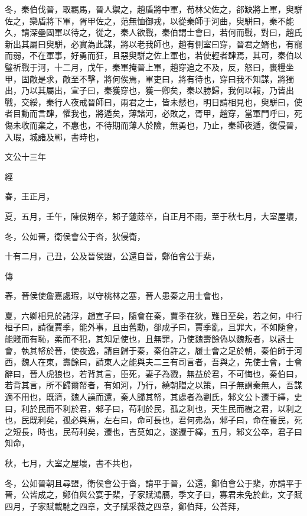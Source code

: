 \documentclass[fontset = none]{ctexart}
\begin{document}
冬，秦伯伐晉，取羈馬，晉人禦之，趙盾將中軍，荀林父佐之，郤缺將上軍，臾駢佐之，欒盾將下軍，胥甲佐之，范無恤御戎，以從秦師于河曲，臾駢曰，秦不能久，請深壘固軍以待之，從之，秦人欲戰，秦伯謂士會曰，若何而戰，對曰，趙氏新出其屬曰臾駢，必實為此謀，將以老我師也，趙有側室曰穿，晉君之婿也，有寵而弱，不在軍事，好勇而狂，且惡臾駢之佐上軍也，若使輕者肆焉，其可，秦伯以璧祈戰于河，十二月，戊午，秦軍掩晉上軍，趙穿追之不及，反，怒曰，裹糧坐甲，固敵是求，敵至不擊，將何俟焉，軍吏曰，將有待也，穿曰我不知謀，將獨出，乃以其屬出，宣子曰，秦獲穿也，獲一卿矣，秦以勝歸，我何以報，乃皆出戰，交綏，秦行人夜戒晉師曰，兩君之士，皆未憖也，明日請相見也，臾駢曰，使者目動而言肆，懼我也，將遁矣，薄諸河，必敗之，胥甲，趙穿，當軍門呼曰，死傷未收而棄之，不惠也，不待期而薄人於險，無勇也，乃止，秦師夜遁，復侵晉，入瑕，城諸及鄆，書時也，





文公十三年


經



春，王正月，

夏，五月，壬午，陳侯朔卒，邾子蘧蒢卒，自正月不雨，至于秋七月，大室屋壞，

冬，公如晉，衛侯會公于沓，狄侵衛，

十有二月，己丑，公及晉侯盟，公還自晉，鄭伯會公于棐，

傳



春，晉侯使詹嘉處瑕，以守桃林之塞，晉人患秦之用士會也，

夏，六卿相見於諸浮，趙宣子曰，隨會在秦，賈季在狄，難日至矣，若之何，中行桓子曰，請復賈季，能外事，且由舊勳，郤成子曰，賈季亂，且罪大，不如隨會，能賤而有恥，柔而不犯，其知足使也，且無罪，乃使魏壽餘偽以魏叛者，以誘士會，執其帑於晉，使夜逸，請自歸于秦，秦伯許之，履士會之足於朝，秦伯師于河西，魏人在東，壽餘曰，請東人之能與夫二三有司言者，吾與之，先使士會，士會辭曰，晉人虎狼也，若背其言，臣死，妻子為戮，無益於君，不可悔也，秦伯曰，若背其言，所不歸爾帑者，有如河，乃行，繞朝贈之以策，曰子無謂秦無人，吾謀適不用也，既濟，魏人譟而還，秦人歸其帑，其處者為劉氏，邾文公卜遷于繹，史曰，利於民而不利於君，邾子曰，苟利於民，孤之利也，天生民而樹之君，以利之也，民既利矣，孤必與焉，左右曰，命可長也，君何弗為，邾子曰，命在養民，死之短長，時也，民苟利矣，遷也，吉莫如之，遂遷于繹，五月，邾文公卒，君子曰知命，

秋，七月，大室之屋壞，書不共也，

冬，公如晉朝且尋盟，衛侯會公于沓，請平于晉，公還，鄭伯會公于棐，亦請平于晉，公皆成之，鄭伯與公宴于棐，子家賦鴻鴈，季文子曰，寡君未免於此，文子賦四月，子家賦載馳之四章，文子賦采薇之四章，鄭伯拜，公荅拜，
\end{document}
